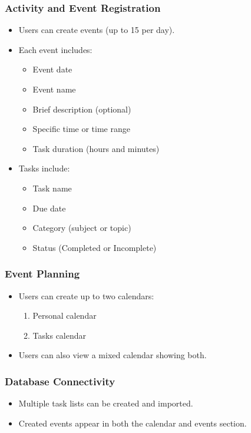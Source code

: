 \documentclass[man]{apa7}
\begin{document}
\subsubsection{Activity and Event Registration}
\begin{itemize}
\item Users can create events (up to 15 per day).
\item Each event includes:
\begin{itemize}
\item Event date
\item Event name
\item Brief description (optional)
\item Specific time or time range
\item Task duration (hours and minutes)
\end{itemize}
\item Tasks include:
\begin{itemize}
\item Task name
\item Due date
\item Category (subject or topic)
\item Status (Completed or Incomplete)
\end{itemize}
\end{itemize}

\subsubsection{Event Planning}
\begin{itemize}
\item Users can create up to two calendars:
\begin{enumerate}
\item Personal calendar
\item Tasks calendar
\end{enumerate}
\item Users can also view a mixed calendar showing both.
\end{itemize}

\subsubsection{Database Connectivity}
\begin{itemize}
\item Multiple task lists can be created and imported.
\item Created events appear in both the calendar and events section.
\end{itemize}
\end{document}
